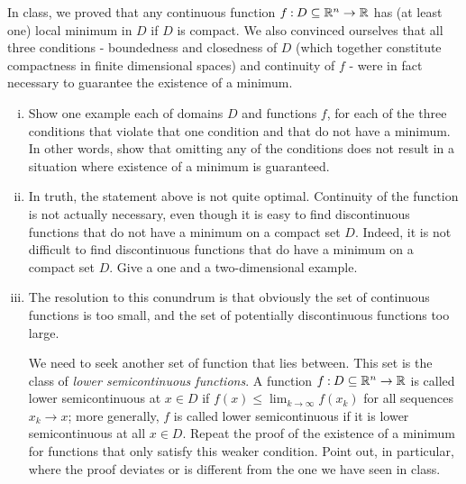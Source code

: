 \documentclass[12pt]{memoir}
\begin{document}
\begin{Ej}
    In class, we proved that any continuous function $f\mathbin{:} D\subseteq \mathbb{R}^n\to\mathbb{R}$ has (at least one) local minimum in $D$ if $D$ is compact. We also convinced ourselves that all three conditions - boundedness and closedness of $D$ (which together constitute compactness in finite
dimensional spaces) and continuity of $f$ - were in fact necessary to guarantee the existence of a minimum.
\begin{enumerate}[i)]
    \itemsep=-0.4em
    \item Show one example each of domains $D$ and functions $f$, for each of the three conditions that violate that one condition and that do not have a minimum. In other words, show that omitting any of the conditions does not result in a situation where existence of a minimum is guaranteed.
    \item In truth, the statement above is not quite optimal. Continuity of the function is not actually necessary, even though it is easy to find discontinuous functions that do not have a minimum on a compact set
    $D$. Indeed, it is not difficult to find discontinuous functions that do have a minimum on a compact set $D$. Give a one and a two-dimensional example.
    \item The resolution to this conundrum is that obviously the set of continuous functions is too small, and the
    set of potentially discontinuous functions too large.\par
    We need to seek another set of function that lies
    between. This set is the class of \emph{lower semicontinuous functions}. A function $f\mathbin{:} D\subseteq \mathbb{R}^n\to\mathbb{R}$ is called
    lower semicontinuous at $x\in D$ if $f(x)\leq \lim_{k\to\infty}f(x_k)$ for all sequences $x_k\to x$; more generally, $f$
    is called lower semicontinuous if it is lower semicontinuous at all $x\in D$. 
    Repeat the proof of the existence of a minimum for functions that only satisfy this weaker condition.
    Point out, in particular, where the proof deviates or is different from the one we have seen in class. %
\end{enumerate}
\end{Ej}
\end{document}
